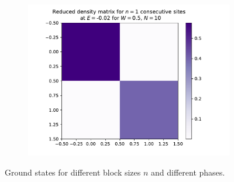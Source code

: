 \documentclass[reprint,amsmath,amssymb,aps,prb]{revtex4-2}
\begin{document}
\begin{center}
\begin{figure}[h!]
\begin{subfigure}[c]{0.45\textwidth}
		\end{subfigure}
		\begin{subfigure}[c]{0.45\textwidth}
			\includegraphics[width=\linewidth]{../results/groundstates/N10n1_trainingset_groundstate_Wmax0.5}
		\end{subfigure}
		\caption{Ground states for different block sizes $n$ and different phases.}
		\label{fig:groundstates_erg}
	\end{figure}
\end{center}
\end{document}
